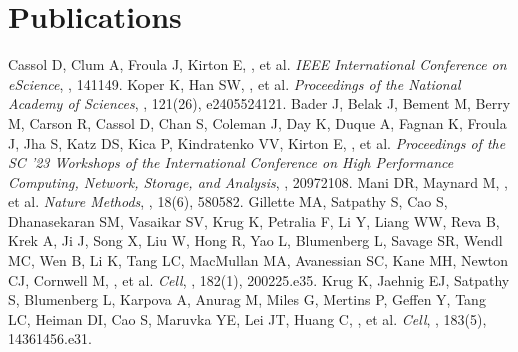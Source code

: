 \documentclass[11pt]{article}
\begin{document}
\section{Publications}
\begin{publicationlist}
  \publicationitem Cassol D, Clum A, Froula J, Kirton E, , et al.  \textit{IEEE International Conference on eScience}, , 141\textendash{}149. 
  \publicationitem Koper K, Han SW, , et al.  \textit{Proceedings of the National Academy of Sciences}, , 121(26), e2405524121. 
  \publicationitem Bader J, Belak J, Bement M, Berry M, Carson R, Cassol D, Chan S, Coleman J, Day K, Duque A, Fagnan K, Froula J, Jha S, Katz DS, Kica P, Kindratenko VV, Kirton E, , et al.  \textit{Proceedings of the SC '23 Workshops of the International Conference on High Performance Computing, Network, Storage, and Analysis}, , 2097\textendash{}2108. 
  \publicationitem Mani DR, Maynard M, , et al.  \textit{Nature Methods}, , 18(6), 580\textendash{}582. 
  \publicationitem Gillette MA, Satpathy S, Cao S, Dhanasekaran SM, Vasaikar SV, Krug K, Petralia F, Li Y, Liang WW, Reva B, Krek A, Ji J, Song X, Liu W, Hong R, Yao L, Blumenberg L, Savage SR, Wendl MC, Wen B, Li K, Tang LC, MacMullan MA, Avanessian SC, Kane MH, Newton CJ, Cornwell M, , et al.  \textit{Cell}, , 182(1), 200\textendash{}225.e35. 
  \publicationitem Krug K, Jaehnig EJ, Satpathy S, Blumenberg L, Karpova A, Anurag M, Miles G, Mertins P, Geffen Y, Tang LC, Heiman DI, Cao S, Maruvka YE, Lei JT, Huang C, , et al.  \textit{Cell}, , 183(5), 1436\textendash{}1456.e31. 

\end{publicationlist}
\end{document}
